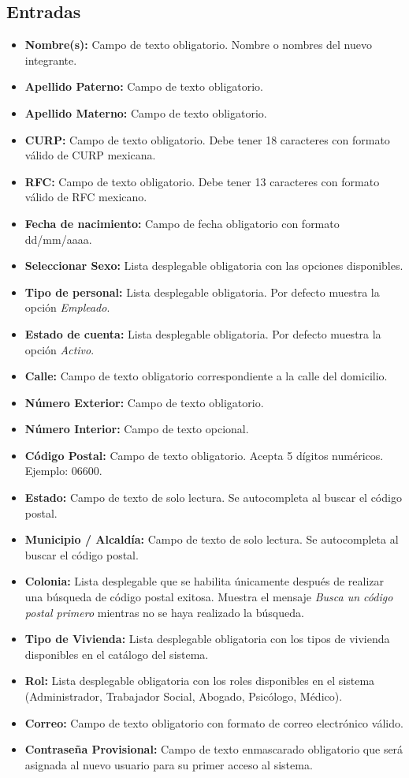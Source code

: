 \subsection{Entradas}
\begin{itemize}
	\item \textbf{Nombre(s):} Campo de texto obligatorio. Nombre o 
	nombres del nuevo integrante.
	\item \textbf{Apellido Paterno:} Campo de texto obligatorio.
	\item \textbf{Apellido Materno:} Campo de texto obligatorio.
	\item \textbf{CURP:} Campo de texto obligatorio. Debe tener 
	18 caracteres con formato válido de CURP mexicana.
	\item \textbf{RFC:} Campo de texto obligatorio. Debe tener 
	13 caracteres con formato válido de RFC mexicano.
	\item \textbf{Fecha de nacimiento:} Campo de fecha obligatorio 
	con formato dd/mm/aaaa.
	\item \textbf{Seleccionar Sexo:} Lista desplegable obligatoria 
	con las opciones disponibles.
	\item \textbf{Tipo de personal:} Lista desplegable obligatoria. 
	Por defecto muestra la opción \textit{Empleado}.
	\item \textbf{Estado de cuenta:} Lista desplegable obligatoria. 
	Por defecto muestra la opción \textit{Activo}.
	\item \textbf{Calle:} Campo de texto obligatorio correspondiente 
	a la calle del domicilio.
	\item \textbf{Número Exterior:} Campo de texto obligatorio.
	\item \textbf{Número Interior:} Campo de texto opcional.
	\item \textbf{Código Postal:} Campo de texto obligatorio. 
	Acepta 5 dígitos numéricos. Ejemplo: 06600.
	\item \textbf{Estado:} Campo de texto de solo lectura. 
	Se autocompleta al buscar el código postal.
	\item \textbf{Municipio / Alcaldía:} Campo de texto de solo 
	lectura. Se autocompleta al buscar el código postal.
	\item \textbf{Colonia:} Lista desplegable que se habilita 
	únicamente después de realizar una búsqueda de código postal 
	exitosa. Muestra el mensaje \textit{Busca un código postal 
		primero} mientras no se haya realizado la búsqueda.
	\item \textbf{Tipo de Vivienda:} Lista desplegable obligatoria 
	con los tipos de vivienda disponibles en el catálogo del sistema.
	\item \textbf{Rol:} Lista desplegable obligatoria con los roles 
	disponibles en el sistema (Administrador, Trabajador Social, 
	Abogado, Psicólogo, Médico).
	\item \textbf{Correo:} Campo de texto obligatorio con formato 
	de correo electrónico válido.
	\item \textbf{Contraseña Provisional:} Campo de texto enmascarado 
	obligatorio que será asignada al nuevo usuario para su primer 
	acceso al sistema.
\end{itemize}

